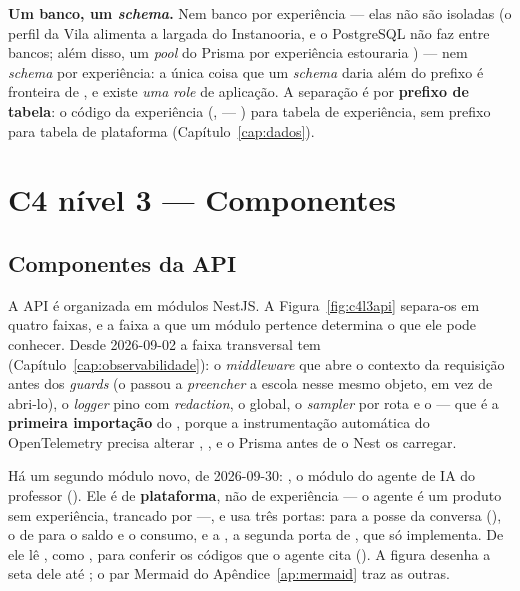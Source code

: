 \begin{regra}
\textbf{Um banco, um \emph{schema}.} Nem banco por experiência --- elas não são
isoladas (o perfil da Vila alimenta a largada do Instanooria, e o PostgreSQL não
faz  entre bancos; além disso, um \emph{pool} do Prisma por experiência
estouraria ) --- nem \emph{schema} por experiência: a única
coisa que um \emph{schema} daria além do prefixo é fronteira de , e
existe \emph{uma} \emph{role} de aplicação. A separação é por
\textbf{prefixo de tabela}: o código da experiência (,
 --- ) para tabela de experiência, sem
prefixo para tabela de plataforma (Capítulo~\ref{cap:dados}).
\end{regra}

\section{C4 nível 3 --- Componentes}
\label{sec:c4l3}

\subsection{Componentes da API}

A API é organizada em módulos NestJS. A Figura~\ref{fig:c4l3api} separa-os em
quatro faixas, e a faixa a que um módulo pertence determina o que ele pode
conhecer. Desde 2026-09-02 a faixa transversal tem  (Capítulo~\ref{cap:observabilidade}):
o \emph{middleware} que abre o contexto da requisição antes dos \emph{guards}
(o  passou a \emph{preencher} a escola nesse mesmo
objeto, em vez de abri-lo), o \emph{logger} pino com \emph{redaction}, o
 global, o \emph{sampler} por rota e o  ---
que é a \textbf{primeira importação} do , porque a
instrumentação automática do OpenTelemetry precisa alterar ,
,  e o Prisma antes de o Nest os carregar.

Há um segundo módulo novo, de 2026-09-30:
, o módulo do agente de IA do professor
(). Ele é de \textbf{plataforma}, não de experiência --- o agente é
um produto sem experiência, trancado por  ---, e
usa três portas:  para a posse da conversa
(), o  de  para o
saldo e o consumo, e a , a segunda porta de ,
que só  implementa. De  ele lê
, como , para conferir os códigos que o
agente cita (). A figura desenha a seta dele até ; o par Mermaid do
Apêndice~\ref{ap:mermaid} traz as outras.

